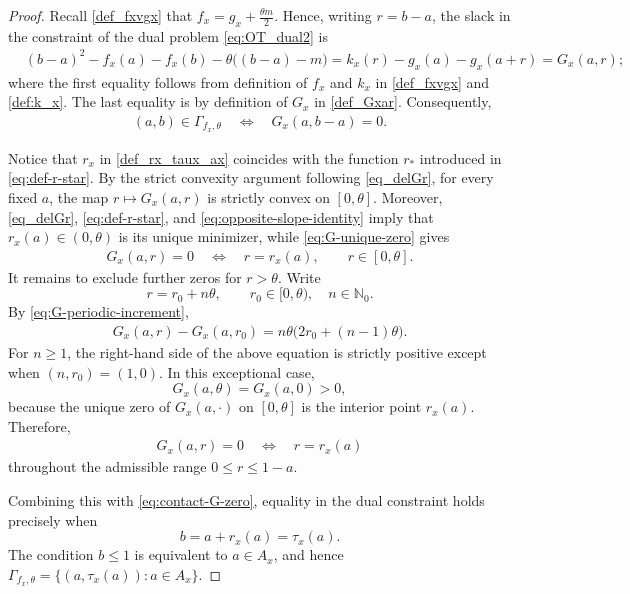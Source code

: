 \documentclass{article}
\begin{document}
\begin{proof}
Recall \eqref{def_fxvgx} that
\(
    f_x=g_x+\frac{\theta m}{2}.
\)
Hence, writing \(r=b-a\), the slack in the constraint of the dual problem \eqref{eq:OT_dual2} is
\begin{align*}
    &(b-a)^2
    -f_x(a)-f_x(b)
    -\theta\bigl((b-a)-m\bigr) 
    =
    k_x(r)-g_x(a)-g_x(a+r)
    =
    G_x(a,r);
\end{align*}
where the first equality follows from definition of \(f_x\) and \(k_x\) in \eqref{def_fxvgx} and \eqref{def:k_x}.
The last equality is by definition of \(G_x\) in \eqref{def_Gxar}.
Consequently,
\begin{align}
    (a,b)\in\Gamma_{f_x,\theta}
    \quad\Longleftrightarrow\quad
    G_x(a,b-a)=0.
    \label{eq:contact-G-zero}
\end{align}

Notice that \(r_x\) in \eqref{def_rx_taux_ax} coincides with the function \(r_*\) introduced in \eqref{eq:def-r-star}.
By the strict convexity argument following \eqref{eq_delGr}, for every fixed \(a\), the map
\(
    r\longmapsto G_x(a,r)
\)
is strictly convex on \([0,\theta]\).
Moreover, \eqref{eq_delGr}, \eqref{eq:def-r-star}, and \eqref{eq:opposite-slope-identity} imply that \(r_x(a)\in(0,\theta)\) is its unique minimizer, while \eqref{eq:G-unique-zero} gives
\begin{align*}
    G_x(a,r)=0
    \quad\Longleftrightarrow\quad
    r=r_x(a),
    \qquad r\in[0,\theta].
\end{align*}
It remains to exclude further zeros for \(r>\theta\).
Write
\[
    r=r_0+n\theta,
    \qquad
    r_0\in[0,\theta),\quad n\in\mathbb N_0.
\]
By \eqref{eq:G-periodic-increment},
\begin{align*}
    G_x(a,r)-G_x(a,r_0)
    =
    n\theta\bigl(2r_0+(n-1)\theta\bigr).
\end{align*}
For \(n\geq1\), the right-hand side of the above equation is strictly positive except when \((n,r_0)=(1,0)\).
In this exceptional case,
\[
    G_x(a,\theta)=G_x(a,0)>0,
\]
because the unique zero of \(G_x(a,\cdot)\) on \([0,\theta]\) is the interior point \(r_x(a)\).
Therefore,
\begin{align*}
    G_x(a,r)=0
    \quad\Longleftrightarrow\quad
    r=r_x(a)
\end{align*}
throughout the admissible range \(0\leq r\leq1-a\).

Combining this with \eqref{eq:contact-G-zero}, equality in the dual constraint holds precisely when
\[
    b=a+r_x(a)=\tau_x(a).
\]
The condition \(b\leq1\) is equivalent to \(a\in A_x\), and hence
\(
    \Gamma_{f_x,\theta}
    =
    \{(a,\tau_x(a)):a\in A_x\}.
\)
\end{proof}
\end{document}
